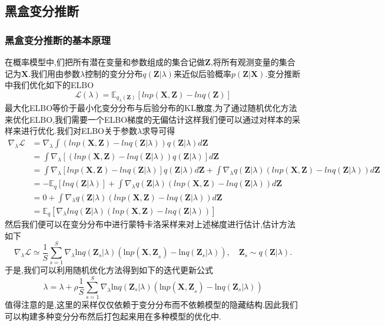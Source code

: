 \documentclass{ctexart}
\begin{document}
\subsection{黑盒变分推断}
\subsubsection{黑盒变分推断的基本原理}
在概率模型中,们把所有潜在变量和参数组成的集合记做$\mathbf{Z}$,将所有观测变量的集合记为$\mathbf{X}$.我们用由参数$\lambda$控制的变分分布$q(\mathbf{Z}|\lambda)$来近似后验概率$p(\mathbf{Z|X})$.变分推断中我们优化如下的ELBO
\begin{equation*}
\mathcal{L}(\lambda) = \mathbb{E}_{q_{\lambda}(\mathbf{Z})}\left[lnp(\mathbf{X,Z})-lnq(\mathbf{Z})\right]
\end{equation*}
最大化ELBO等价于最小化变分分布与后验分布的KL散度,为了通过随机优化方法来优化ELBO,我们需要一个ELBO梯度的无偏估计这样我们便可以通过对样本的采样来进行优化.我们对ELBO关于参数$\lambda$求导可得
\begin{align*}
\nabla_{\lambda}\mathcal{L} &=
\nabla_{\lambda}\int (lnp(\mathbf{X,Z})-lnq(\mathbf{Z}|\lambda))q(\mathbf{Z}|\lambda)d\mathbf{Z}\\&=
\int \nabla_{\lambda}[(lnp(\mathbf{X,Z})-lnq(\mathbf{Z}|\lambda))q(\mathbf{Z}|\lambda)]d\mathbf{Z}\\&=
\int\nabla_{\lambda}[lnp(\mathbf{X,Z})-lnq(\mathbf{Z}|\lambda)]q(\mathbf{Z}|\lambda)d\mathbf{Z}+\int\nabla_{\lambda}q(\mathbf{Z}|\lambda)(lnp(\mathbf{X,Z})-lnq(\mathbf{Z}|\lambda))d\mathbf{Z}\\&=
-\mathbb{E}_{q}[lnq(\mathbf{Z}|\lambda)]+\int\nabla_{\lambda}q(\mathbf{Z}|\lambda)(lnp(\mathbf{X,Z})-lnq(\mathbf{Z}|\lambda))d\mathbf{Z}\\&=
0+\int\nabla_{\lambda}q(\mathbf{Z}|\lambda)(lnp(\mathbf{X,Z})-lnq(\mathbf{Z}|\lambda))d\mathbf{Z}\\&=
 \mathbb{E}_{q}\left[\nabla_{\lambda}lnq(\mathbf{Z}|\lambda)(lnp(\mathbf{X,Z})-lnq(\mathbf{Z}|\lambda))\right]
\end{align*}
然后我们便可以在变分分布中进行蒙特卡洛采样来对上述梯度进行估计,估计方法如下
\begin{equation*}
\nabla_{\lambda}\mathcal{L} \simeq \frac{1}{S}\sum_{s=1}^{S}\nabla_{\lambda}\text{ln}q(\mathbf{Z}_s|\lambda)(\text{ln}p(\mathbf{X,Z}_s)-\text{ln}q(\mathbf{Z}_s|\lambda)),\quad \mathbf{Z}_s\sim q(\mathbf{Z}|\lambda).
\end{equation*}
于是,我们可以利用随机优化方法得到如下的迭代更新公式
\begin{equation*}
\lambda = \lambda + \rho \frac{1}{S}\sum_{s=1}^{S}\nabla_{\lambda}\text{ln}q(\mathbf{Z}_s|\lambda)(\text{ln}p(\mathbf{X,Z}_s)-\text{ln}q(\mathbf{Z}_s|\lambda))
\end{equation*}
值得注意的是,这里的采样仅仅依赖于变分分布而不依赖模型的隐藏结构.因此我们可以构建多种变分分布然后打包起来用在多种模型的优化中.\cite{ranganath2014black}
\end{document}
